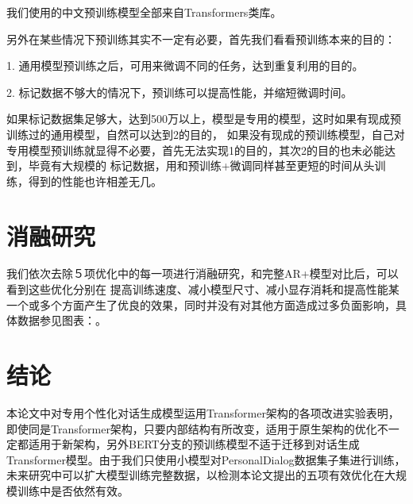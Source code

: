 \documentclass[letterpaper]{article} %
\DeclareRobustCommand{\citeext}[1]{\cite[#1]{#1}}
\begin{document}
\begin{CJK*}{UTF8}{gbsn}
我们使用的中文预训练模型全部来自Transformers类库\citeext{Wolf2019HuggingFacesTS}。

另外在某些情况下预训练其实不一定有必要，首先我们看看预训练本来的目的：

1. 通用模型预训练之后，可用来微调不同的任务，达到重复利用的目的。

2. 标记数据不够大的情况下，预训练可以提高性能，并缩短微调时间。

如果标记数据集足够大，达到500万以上，模型是专用的模型，这时如果有现成预训练过的通用模型，自然可以达到2的目的，
如果没有现成的预训练模型，自己对专用模型预训练就显得不必要，首先无法实现1的目的，其次2的目的也未必能达到，毕竟有大规模的
标记数据，用和预训练+微调同样甚至更短的时间从头训练，得到的性能也许相差无几。


\section[Ablation Study]{消融研究} 
我们依次去除５项优化中的每一项进行消融研究，和完整AR+模型对比后，可以看到这些优化分别在%
提高训练速度、减小模型尺寸、减小显存消耗和提高性能某一个或多个方面产生了优良的效果，同时并没有对其他方面造成过多负面影响，具体数据参见图表：。

\section[Conclusion]{结论} 
本论文中对专用个性化对话生成模型运用Transformer架构的各项改进实验表明，即使同是Transformer架构，只要内部结构有所改变，适用于原生架构的优化不一定都适用于新架构，另外BERT分支的预训练模型不适于迁移到对话生成Transformer模型。由于我们只使用小模型对PersonalDialog数据集子集进行训练，未来研究中可以扩大模型训练完整数据，以检测本论文提出的五项有效优化在大规模训练中是否依然有效。




\clearpage\end{CJK*}
\end{document}
